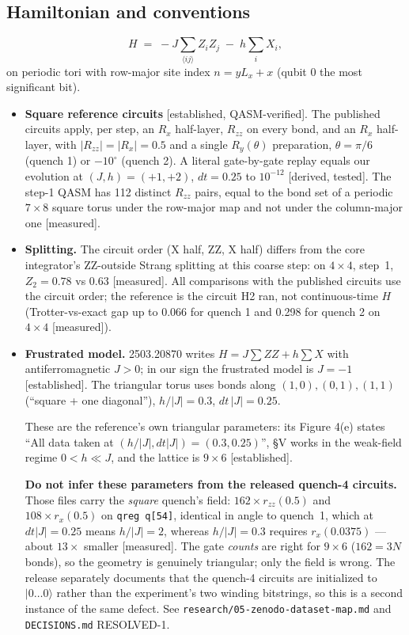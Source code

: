 \documentclass[11pt,a4paper]{article}
\newcommand{\tg}[1]{\textsf{\small[#1]}}
\newcommand{\est}{\tg{established}}
\newcommand{\mea}{\tg{measured}}
\begin{document}
\subsection{Hamiltonian and conventions}
\begin{equation}
  H \;=\; -J\sum_{\langle ij\rangle} Z_iZ_j \;-\; h\sum_i X_i ,
\end{equation}
on periodic tori with row-major site index $n=y L_x+x$ (qubit 0 the most significant bit).
\begin{itemize}
\item \textbf{Square reference circuits} \tg{established, QASM-verified}. The published circuits apply, per step, an
  $R_x$ half-layer, $R_{zz}$ on every bond, and an $R_x$ half-layer, with $|R_{zz}|=|R_x|=0.5$ and a single
  $R_y(\theta)$ preparation, $\theta=\pi/6$ (quench 1) or $-10^\circ$ (quench 2). A literal gate-by-gate replay
  equals our evolution at $(J,h)=(+1,+2)$, $dt=0.25$ to $10^{-12}$ \tg{derived, tested}. The step-1 QASM has 112
  distinct $R_{zz}$ pairs, equal to the bond set of a periodic $7\times8$ square torus under the row-major map
  and not under the column-major one \mea.
\item \textbf{Splitting.} The circuit order (X half, ZZ, X half) differs from the core integrator's ZZ-outside
  Strang splitting at this coarse step: on $4\times4$, step~1, $Z_2=0.78$ vs $0.63$ \mea. All comparisons with the
  published circuits use the circuit order; the reference is the circuit H2 ran, not continuous-time $H$
  (Trotter-vs-exact gap up to 0.066 for quench 1 and 0.298 for quench 2 on $4\times4$ \mea).
\item \textbf{Frustrated model.} 2503.20870 writes $H=J\sum ZZ+h\sum X$ with antiferromagnetic $J>0$; in our
  sign the frustrated model is $J=-1$ \est. The triangular torus uses bonds along $(1,0),(0,1),(1,1)$
  (``square + one diagonal''), $h/|J|=0.3$, $dt\,|J|=0.25$.

  These are the reference's own triangular parameters: its Figure 4(e) states ``All data taken at
  $(h/|J|, dt|J|)=(0.3, 0.25)$'', \S V works in the weak-field regime $0<h\ll J$, and the lattice is
  $9\times6$ \est.

  \textbf{Do not infer these parameters from the released quench-4 circuits.} Those files carry the
  \emph{square} quench's field: $162\times r_{zz}(0.5)$ and $108\times r_x(0.5)$ on
  \texttt{qreg q[54]}, identical in angle to quench~1, which at $dt|J|=0.25$ means $h/|J|=2$, whereas
  $h/|J|=0.3$ requires $r_x(0.0375)$ --- about $13\times$ smaller \mea. The gate \emph{counts} are
  right for $9\times6$ ($162=3N$ bonds), so the geometry is genuinely triangular; only the field is
  wrong. The release separately documents that the quench-4 circuits are initialized to
  $|0\ldots0\rangle$ rather than the experiment's two winding bitstrings, so this is a second
  instance of the same defect. See \texttt{research/05-zenodo-dataset-map.md} and
  \texttt{DECISIONS.md} RESOLVED-1.


\end{itemize}
\end{document}
